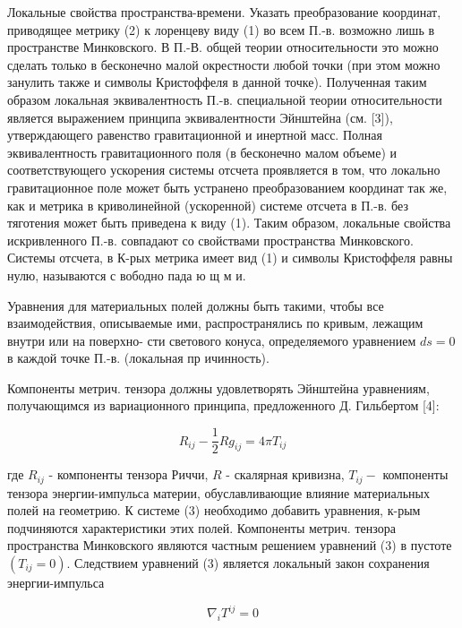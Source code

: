 \documentclass[10pt]{article}
\begin{document}
Локальные свойства пространства-времени. Указать преобразование координат, приводящее метрику (2) к лоренцеву виду (1) во всем П.-в. возможно лишь в пространстве Минковского. В П.-В. общей теории относительности это можно сделать только в бесконечно малой окрестности любой точки (при этом можно занулить также и символы Кристоффеля в данной точке). Полученная таким образом локальная эквивалентность П.-в. специальной теории относительности является выражением принципа эквивалентности Эйнштейна (см. [3]), утверждающего равенство гравитационной и инертной масс. Полная эквивалентность гравитационного поля (в бесконечно малом объеме) и соответствующего ускорения системы отсчета проявляется в том, что локально гравитационное поле может быть устранено преобразованием координат так же, как и метрика в криволинейной (ускоренной) системе отсчета в П.-в. без тяготения может быть приведена к виду (1). Таким образом, локальные свойства искривленного П.-в. совпадают со свойствами пространства Минковского. Системы отсчета, в К-рых метрика имеет вид (1) и символы Кристоффеля равны нулю, называются с вободно пада ю щ м и.



Уравнения для материальных полей должны быть такими, чтобы все взаимодействия, описываемые ими, распространялись по кривым, лежащим внутри или на поверхно- сти светового конуса, определяемого уравнением $d s=0$ в каждой точке П.-в. (локальная пр ичинность).



Компоненты метрич. тензора должны удовлетворять Эйнштейна уравнениям, получающимся из вариационного принципа, предложенного Д. Гильбертом [4]:



\[

R_{i j}-\frac{1}{2} R g_{i j}=4 \pi T_{i j}

\]



где $R_{i j}$ - компоненты тензора Риччи, $R$ - скалярная кривизна, $T_{i j}-$ компоненты тензора энергии-импульса материи, обуславливающие влияние материальных полей на геометрию. К системе (3) необходимо добавить уравнения, к-рым подчиняются характеристики этих полей. Компоненты метрич. тензора пространства Минковского являются частным решением уравнений (3) в пустоте $\left(T_{i j}=0\right)$. Следствием уравнений (3) является локальный закон сохранения энергии-импульса



\[

\nabla_{i} T^{i j}=0

\]
\end{document}
